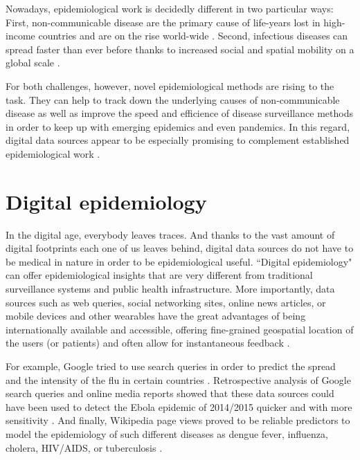 \documentclass[11pt, a4paper,twoside]{report}\usepackage[]{graphicx}\usepackage[]{color}
\begin{document}
Nowadays, epidemiological work is decidedly different in two particular ways: First, non-communicable disease are the primary cause of life-years lost in high-income countries and are on the rise world-wide \citep{lozano_global_2013}. Second, infectious diseases can spread faster than ever before thanks to increased social and spatial mobility on a global scale \citep{hufnagel_forecast_2004}. 

For both challenges, however, novel epidemiological methods are rising to the task. They can help to track down the underlying causes of non-communicable disease as well as improve the speed and efficience of disease surveillance methods in order to keep up with emerging epidemics and even pandemics. In this regard, digital data sources appear to be especially promising to complement established epidemiological work \citep{salathe_digital_2012, simonsen_infectious_2016}.

\section{Digital epidemiology}

In the digital age, everybody leaves traces. And thanks to the vast amount of digital footprints each one of us leaves behind, digital data sources do not have to be medical in nature in order to be epidemiological useful. ``Digital epidemiology" can offer epidemiological insights that are very different from traditional surveillance systems and public health infrastructure. More importantly, data sources such as web queries, social networking sites, online news articles, or mobile devices and other wearables have the great advantages of being internationally available and accessible, offering fine-grained geospatial location of the users (or patients) and often allow for instantaneous feedback \citep{salathe_digital_2012}. 

For example, Google tried to use search queries in order to predict the spread and the intensity of the flu in certain countries \citep{ginsberg_detecting_2009}. Retrospective analysis of Google search queries and online media reports showed that these data sources could have been used to detect the Ebola epidemic of 2014/2015 quicker and with more sensitivity \citep{anema_digital_2014, milinovich_role_2015}. And finally, Wikipedia page views proved to be reliable predictors to model the epidemiology of such different diseases as dengue fever, influenza, cholera, HIV/AIDS, or tuberculosis \citep{generous_global_2014}.\newline 
\end{document}
